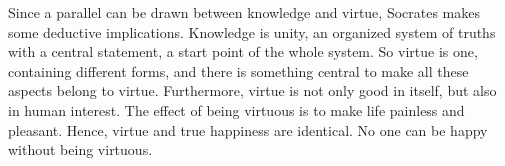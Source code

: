 \documentclass[11pt]{article}
\begin{document}
\begin{sloppypar}
\par

Since a parallel can be drawn between knowledge and virtue, Socrates makes some deductive implications. 
Knowledge is unity, an organized system of truths with a central statement, a start point of the whole system. 
So virtue is one, containing different forms, and there is something central to make all these aspects belong to virtue. 
Furthermore, virtue is not only good in itself, but also in human interest. 
The effect of being virtuous is to make life painless and pleasant. 
Hence, virtue and true happiness are identical. 
No one can be happy without being virtuous.

\end{sloppypar}
\end{document}
